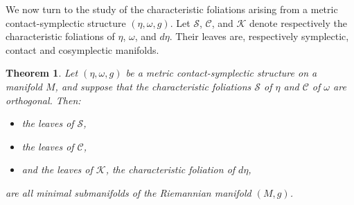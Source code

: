 \documentclass[12pt]{amsart}
\newtheorem{theorem}{Theorem}
\theoremstyle{definition}
\theoremstyle{remark}
\begin{document}
\noindent
We now turn to the study of the characteristic foliations arising from a metric contact-symplectic structure 
$(\eta, \omega, g)$. 
Let $\mathcal{S}$, $\mathcal{C}$, and $\mathcal{K}$ denote respectively the characteristic foliations of $\eta$, $\omega$, and $d\eta$. Their leaves are, respectively symplectic, contact and cosymplectic manifolds.



\begin{theorem}
Let $(\eta, \omega, g)$ be a metric contact-symplectic structure on a manifold $M$, and suppose that the characteristic foliations $\mathcal{S}$ of $\eta$ and $\mathcal{C}$ of $\omega$ are orthogonal. Then:
\begin{itemize}[label=--]
\item the leaves of $\mathcal{S}$,
\item the leaves of $\mathcal{C}$,
\item and the leaves of $\mathcal{K}$, the characteristic foliation of $d\eta$,
\end{itemize}
are all minimal submanifolds of the Riemannian manifold $(M, g)$.
\end{theorem}
\end{document}
